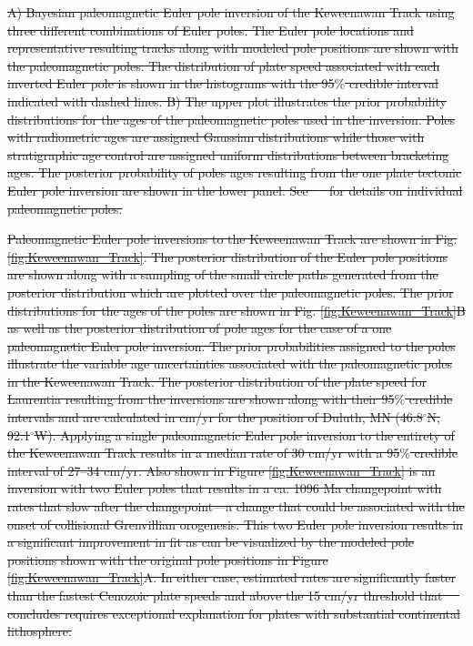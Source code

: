 \documentclass[11pt,letterpaper]{article}
\providecommand{\DIFdeltex}[1]{{\protect\color{red}\sout{#1}}}                      %
\providecommand{\DIFdelFL}[1]{\DIFdel{#1}} %
\providecommand{\DIFdel}[1]{\texorpdfstring{\DIFdeltex{#1}}{}} %
\begin{document}
{%
\DIFdelFL{A) Bayesian paleomagnetic Euler pole inversion of the Keweenawan Track using three different combinations of Euler poles. The Euler pole locations and representative resulting tracks along with modeled pole positions are shown with the paleomagnetic poles. The distribution of plate speed associated with each inverted Euler pole is shown in the histograms with the 95$\%$ credible interval indicated with dashed lines. B) The upper plot illustrates the prior probability distributions for the ages of the paleomagnetic poles used in the inversion. Poles with radiometric ages are assigned Gaussian distributions while those with stratigraphic age control are assigned uniform distributions between bracketing ages. The posterior probability of poles ages resulting from the one plate tectonic Euler pole inversion are shown in the lower panel. See \mbox{%
\cite{Swanson-Hysell2019a} }\hspace{0pt}%
for details on individual paleomagnetic poles.}}

\DIFdel{Paleomagnetic Euler pole inversions to the Keweenawan Track are shown in Fig. \ref{fig:Keweenawan_Track}. The posterior distribution of the Euler pole positions are shown along with a sampling of the small circle paths generated from the posterior distribution which are plotted over the paleomagnetic poles. The prior distributions for the ages of the poles are shown in Fig. \ref{fig:Keweenawan_Track}B as well as the posterior distribution of pole ages for the case of a one paleomagnetic Euler pole inversion. The prior probabilities assigned to the poles illustrate the variable age uncertainties associated with the paleomagnetic poles in the Keweenawan Track. The posterior distribution of the plate speed for Laurentia resulting from the inversions are shown along with their 95$\%$ credible intervals and are calculated in cm/yr for the position of Duluth, MN (46.8$^\circ$N, 92.1$^\circ$W). Applying a single paleomagnetic Euler pole inversion to the entirety of the Keweenawan Track results in a median rate of 30 cm/yr with a 95$\%$ credible interval of 27–34 cm/yr. Also shown in Figure \ref{fig:Keweenawan_Track} is an inversion with two Euler poles that results in a ca. 1096 Ma changepoint with rates that slow after the changepoint---a change that could be associated with the onset of collisional Grenvillian orogenesis. This two Euler pole inversion results in a significant improvement in fit as can be visualized by the modeled pole positions shown with the original pole positions in Figure \ref{fig:Keweenawan_Track}A. In either case, estimated rates are significantly faster than the fastest Cenozoic plate speeds and above the 15 cm/yr threshold that \mbox{%
\cite{Zahirovic2015a} }\hspace{0pt}%
concludes requires exceptional explanation for plates with substantial continental lithosphere.
}%
\end{document}
